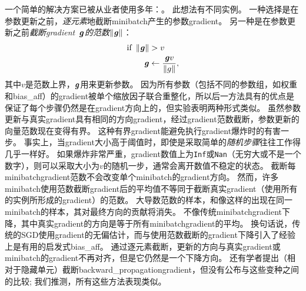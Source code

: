 一个简单的解决方案已被从业者使用多年：。
此想法有不同实例\citep{Mikolov-thesis-2012,Pascanu+al-ICML2013-small}。
一种选择是在参数更新之前，\emph{逐元素}地截断\gls{minibatch}产生的参数\gls{gradient}\citep{Mikolov-thesis-2012}。
另一种是在参数更新之前\emph{截断\gls{gradient}~$\boldsymbol{\mathit{g}}$的范数$\left\lVert \boldsymbol{\mathit{g}} \right\rVert$}\citep{Pascanu+al-ICML2013-small}：
\begin{align}
 \text{if}~ \left\lVert\boldsymbol{\mathit{g}}\right\rVert &> v \\
 \boldsymbol{\mathit{g}} &\gets \frac{\boldsymbol{\mathit{g}} v}{\left\lVert g\right\rVert},
\end{align}
其中$v$是范数上界，$\boldsymbol{\mathit{g}}$用来更新参数。
因为所有参数（包括不同的参数组，如权重和\gls{bias_aff}）的\gls{gradient}被单个缩放因子联合重整化，所以后一方法具有的优点是保证了每个步骤仍然是在\gls{gradient}方向上的，但实验表明两种形式类似。
虽然参数更新与真实\gls{gradient}具有相同的方向\gls{gradient}，经过\gls{gradient}范数截断，参数更新的向量范数现在变得有界。
这种有界\gls{gradient}能避免执行\gls{gradient}爆炸时的有害一步。
事实上，当\gls{gradient}大小高于阈值时，即使是采取简单的\emph{随机步骤}往往工作得几乎一样好。
如果爆炸非常严重，\gls{gradient}数值上为{\tt Inf}或{\tt Nan}（无穷大或不是一个数字），则可以采取大小为$v$的随机一步，通常会离开数值不稳定的状态。
截断每\gls{minibatch}\gls{gradient}范数不会改变单个\gls{minibatch}的\gls{gradient}方向。
然而，许多\gls{minibatch}使用范数截断\gls{gradient}后的平均值不等同于截断真实\gls{gradient}（使用所有的实例所形成的\gls{gradient}）的范数。
大导数范数的样本，和像这样的出现在同一\gls{minibatch}的样本，其对最终方向的贡献将消失。
不像传统\gls{minibatch}\gls{gradient}下降，其中真实\gls{gradient}的方向是等于所有\gls{minibatch}\gls{gradient}的平均。
换句话说，传统的\gls{SGD}使用\gls{gradient}的无偏估计，而与使用范数截断的\gls{gradient}下降引入了经验上是有用的启发式\gls{bias_aff}。
通过逐元素截断，更新的方向与真实\gls{gradient}或\gls{minibatch}的\gls{gradient}不再对齐，但是它仍然是一个下降方向。
还有学者提出\citep{Graves-arxiv2013}（相对于隐藏单元）截断\gls{backward_propagation}\gls{gradient}，但没有公布与这些变种之间的比较; 我们推测，所有这些方法表现类似。


